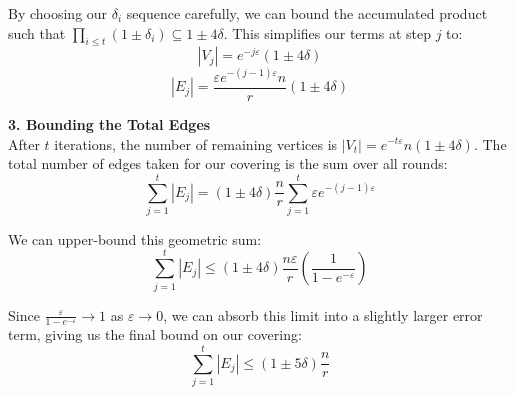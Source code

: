 \documentclass[a4paper]{article}
\begin{document}
By choosing our $\delta_i$ sequence carefully, we can bound the accumulated product such that $\prod_{i \le t}(1 \pm \delta_i) \subseteq 1 \pm 4\delta$. This simplifies our terms at step $j$ to:
$$|V_j| = e^{-j\varepsilon}(1 \pm 4\delta)$$
$$|E_j| = \frac{\varepsilon e^{-(j-1)\varepsilon}n}{r}(1 \pm 4\delta)$$

\textbf{3. Bounding the Total Edges} \\
After $t$ iterations, the number of remaining vertices is $|V_t| = e^{-t\varepsilon}n(1 \pm 4\delta)$. The total number of edges taken for our covering is the sum over all rounds:
$$\sum_{j=1}^t |E_j| = (1 \pm 4\delta)\frac{n}{r}\sum_{j=1}^t \varepsilon e^{-(j-1)\varepsilon}$$

We can upper-bound this geometric sum:
$$\sum_{j=1}^t |E_j| \le (1 \pm 4\delta)\frac{n\varepsilon}{r}\left(\frac{1}{1 - e^{-\varepsilon}}\right)$$

Since $\frac{\varepsilon}{1 - e^{-\varepsilon}} \rightarrow 1$ as $\varepsilon \rightarrow 0$, we can absorb this limit into a slightly larger error term, giving us the final bound on our covering:
$$\sum_{j=1}^t |E_j| \le (1 \pm 5\delta)\frac{n}{r}$$
\newpage
\end{document}
